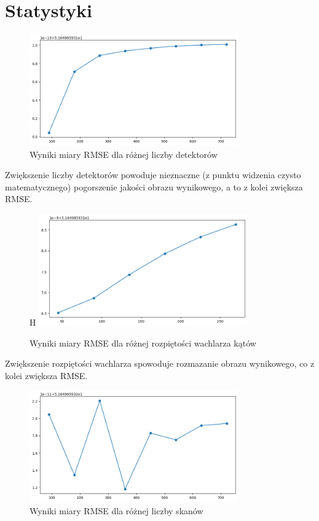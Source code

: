 \documentclass[11pt,a4paper]{article}
\begin{document}
    \section{Statystyki}
    \begin{figure}[H]
        \centering
        \includegraphics[width=0.8\textwidth]{rmse_detectors}
        \caption{Wyniki miary RMSE dla różnej liczby detektorów}
    \end{figure}
    Zwiększenie liczby detektorów powoduje nieznaczne (z punktu widzenia czysto matematycznego) pogorszenie
    jakości obrazu wynikowego, a to z kolei zwiększa RMSE.
    \begin{figure}{H}
        \centering
        \includegraphics[width=0.8\textwidth]{mse_fan}
        \caption{Wyniki miary RMSE dla różnej rozpiętości wachlarza kątów}
    \end{figure}
    Zwiększenie rozpiętości wachlarza spowoduje rozmazanie obrazu wynikowego, co z kolei zwiększa RMSE.

    \begin{figure}[H]
        \centering
        \includegraphics[width=0.8\textwidth]{mse_amount}
        \caption{Wyniki miary RMSE dla różnej liczby skanów}
    \end{figure}
\end{document}
